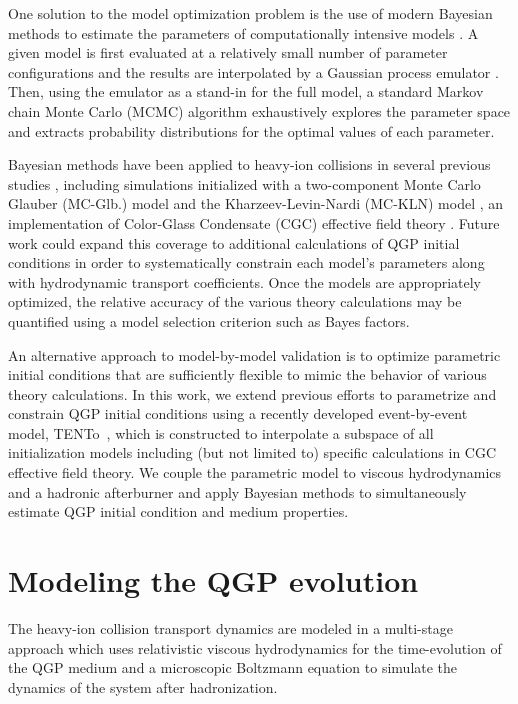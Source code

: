 \documentclass[aps,prc,reprint,amsmath,nofootinbib,superscriptaddress]{revtex4-1}
\newcommand{\trento}{T\raisebox{-0.5ex}{R}ENTo}
\begin{document}
One solution to the model optimization problem is the use of modern Bayesian methods to estimate the parameters of computationally intensive models \cite{OHagan:2006ba, Higdon:2008cmc, Higdon:2014tva, Wesolowski:2015fqa}.
A given model is first evaluated at a relatively small number of parameter configurations and the results are interpolated by a Gaussian process emulator \cite{Rasmussen:2006gp}.
Then, using the emulator as a stand-in for the full model, a standard Markov chain Monte Carlo (MCMC) algorithm exhaustively explores the parameter space and extracts probability distributions for the optimal values of each parameter.

Bayesian methods have been applied to heavy-ion collisions in several previous studies \cite{Novak:2013bqa, Pratt:2015zsa, Bernhard:2015hxa, Sangaline:2015isa}, including simulations initialized with a two-component Monte Carlo Glauber (MC-Glb.) model \cite{Miller:2007ri} and the Kharzeev-Levin-Nardi (MC-KLN) model \cite{Drescher:2006pi}, an implementation of Color-Glass Condensate (CGC) effective field theory \cite{Gelis:2010nm, Gelis:2015gza}.
Future work could expand this coverage to additional calculations of QGP initial conditions in order to systematically constrain each model's parameters along with hydrodynamic transport coefficients.
Once the models are appropriately optimized, the relative accuracy of the various theory calculations may be quantified using a model selection criterion such as Bayes factors.

An alternative approach to model-by-model validation is to optimize parametric initial conditions that are sufficiently flexible to mimic the behavior of various theory calculations.
In this work, we extend previous efforts to parametrize and constrain QGP initial conditions \cite{Novak:2013bqa, Pratt:2015zsa, Sangaline:2015isa} using a recently developed event-by-event model, \trento\ \cite{Moreland:2014oya}, which is constructed to interpolate a subspace of all initialization models including (but not limited to) specific calculations in CGC effective field theory.
We couple the parametric model to viscous hydrodynamics and a hadronic afterburner and apply Bayesian methods to simultaneously estimate QGP initial condition and medium properties.


\section{Modeling the QGP evolution}

The heavy-ion collision transport dynamics are modeled in a multi-stage approach which uses relativistic viscous hydrodynamics for the time-evolution of the QGP medium and a microscopic Boltzmann equation to simulate the dynamics of the system after hadronization.
\end{document}
